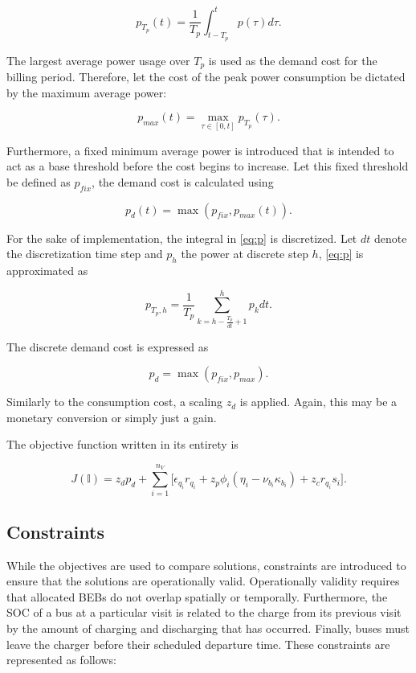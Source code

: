 \documentclass[energies,article,submit,moreauthors]{Definitions/mdpi}
\newcommand{\I}{\mathbb{I}}                 %
\begin{document}
\begin{equation}
\label{eq:p}
p_{T_p}(t) = \frac{1}{T_p} \int_{t-T_p}^{t} p(\tau) d\tau\text{.}
\end{equation}

The largest average power usage over \(T_p\) is used as the demand cost for the billing period. Therefore, let the cost of
the peak power consumption be dictated by the maximum average power:

\begin{equation}
\label{eq:pmax}
p_{max}(t) = \max\limits_{\tau \in [0,t]}p_{T_p}(\tau)\text{.}
\end{equation}

Furthermore, a fixed minimum average power is introduced that is intended to act as a base threshold before the cost
begins to increase. Let this fixed threshold be defined as \(p_{fix}\), the demand cost is calculated using

\begin{equation}
\label{eq:pdem}
p_d(t) = \max(p_{fix},p_{max}(t))\text{.}
\end{equation}

For the sake of implementation, the integral in \ref{eq:p} is discretized. Let \(dt\) denote the discretization time step and
\(p_h\) the power at discrete step \(h\), \ref{eq:p} is approximated as

\begin{equation}
p_{T_p,h} = \frac{1}{T_p} \sum_{k = h-\frac{T_p}{dt}+1}^h p_k dt\text{.}
\end{equation}

The discrete demand cost is expressed as

\begin{equation}
\label{eq:pd-dis}
  p_d = \max(p_{fix}, p_{max})\text{.}
\end{equation}

Similarly to the consumption cost, a scaling \(z_d\) is applied. Again, this may be a monetary conversion or simply just a
gain.

The objective function written in its entirety is

\begin{equation}
\label{eq:objective-function}
  J(\I) = z_d p_d + \sum_{i=1}^{n_V} \Big[ \epsilon_{q_i}r_{q_i} + z_p \phi_i(\eta_i - \nu_{b_i} \kappa_{b_i}) + z_c r_{q_i} s_i \Big] \text{.}
\end{equation}

\subsection{Constraints}
\label{sec:sa-constraints}
While the objectives are used to compare solutions, constraints are introduced to ensure that the solutions are
operationally valid. Operationally validity requires that allocated BEBs do not overlap spatially or temporally.
Furthermore, the SOC of a bus at a particular visit is related to the charge from its previous visit by the amount of
charging and discharging that has occurred. Finally, buses must leave the charger before their scheduled departure time.
These constraints are represented as follows:
\end{document}
